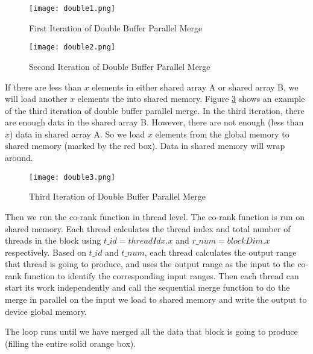     \begin{figure}[!h]
    \begin{center}
    \texttt{[image: double1.png]}
    \end{center}
    \caption{{\label{fig:double1}} First Iteration of Double Buffer Parallel Merge}
    \end{figure}

    \begin{figure}[!h]
    \begin{center}
    \texttt{[image: double2.png]}
    \end{center}
    \caption{{\label{fig:double2}} Second Iteration of Double Buffer Parallel Merge}
    \end{figure}

    If there are less than $x$ elements in either shared array A or shared array B, 
    we will load another $x$ elements the into shared memory. Figure \ref{fig:double3} 
    shows an example of the third iteration of double buffer parallel 
    merge. In the third iteration, there are enough data in the shared array B. However,
    there are not enough (less than $x$) data in shared array A. So we load $x$ elements 
    from the global memory to shared memory (marked by the red box). Data in shared memory 
    will wrap around.  

    \begin{figure}[!h]
    \begin{center}
    \texttt{[image: double3.png]}
    \end{center}
    \caption{{\label{fig:double3}} Third Iteration of Double Buffer Parallel Merge}
    \end{figure}
 
    Then we run the co-rank function in thread level. The co-rank function is run on 
    shared memory. Each thread calculates the thread index and total number of threads 
    in the block using $t\_id = threadIdx.x$ and $r\_num = blockDim.x$ respectively. 
    Based on $t\_id$ and $t\_num$, each thread calculates the output range 
    that thread is going to produce, and uses the output range as the input to the co-rank function 
    to identify the corresponding input ranges.  
    Then each thread can start its work independently and call the sequential merge function to do 
    the merge in parallel on the input we load to shared memory and write the output to device 
    global memory.

    The loop runs until we have merged all the data that block is going to produce (filling 
    the entire solid orange box).   

